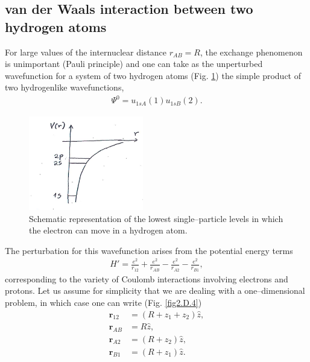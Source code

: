 \begin{subappendices}
\subsection{van der Waals interaction between two hydrogen atoms}
For large values of the internuclear distance $r_{AB}=R$, the exchange phenomenon is unimportant (Pauli principle) and one can take as the unperturbed wavefunction for a system of two hydrogen atoms (Fig. \ref{fig2.D.3}) the simple product of two hydrogenlike wavefunctions,
\begin{align}\label{eq2.D.1}
\Psi^0=u_{1sA}(1)u_{1sB}(2).
\end{align}
   \begin{figure}
    \centerline{\includegraphics*[width=5cm,angle=0]{nutshell/figs/fig2D3.pdf}}
    \caption{Schematic representation of the lowest single--particle levels in which the electron can move in a hydrogen atom.}\label{fig2.D.3}
    \end{figure}
The perturbation for this wavefunction arises from the potential energy terms
\begin{align}\label{eq2.D.2}
H'=\frac{e^2}{r_{12}}+\frac{e^2}{r_{AB}}-\frac{e^2}{r_{A2}}-\frac{e^2}{r_{B1}},
\end{align}
corresponding to the variety of Coulomb interactions involving electrons and protons. Let us assume for simplicity that we are dealing with a one--dimensional problem, in which case one can write (Fig. \ref{fig2.D.4})
\begin{align}\label{eq2.D.3}
\nonumber \mathbf r_{12}&=\left(R+z_1+z_2\right)\hat z,\\
\nonumber \mathbf r_{AB}&=R\hat z,\\
\nonumber \mathbf r_{A2}&=\left(R+z_2\right)\hat z,\\
\mathbf r_{B1}&=\left(R+z_1\right)\hat z.
\end{align}


\end{subappendices}

